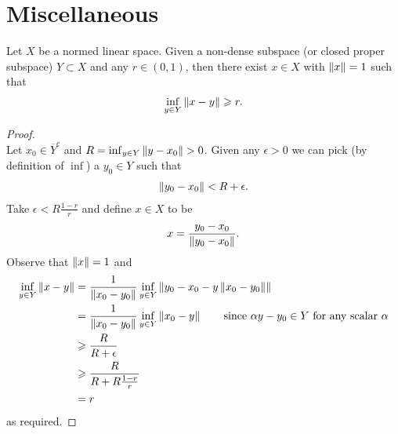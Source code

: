 \documentclass{article}
\begin{document}
\section{Miscellaneous}
\begin{flemma}
Let $X$ be a normed linear space. Given a non-dense subspace (or closed proper subspace) $Y \subset X$ and any $r \in (0, 1)$, then there exist $x \in X$ with $\norm[x] = 1$ such that 
\begin{align*}
\inf_{y \in Y} \norm[x - y] \geq r. 
\end{align*}


\begin{proof}\hfill \\
Let $x_0 \in \overline{Y}^c$ and $R = \inf_{y \in Y}\norm[y - x_0] > 0$. Given any $\epsilon > 0$ we can pick (by definition of $\inf$) a $y_0 \in Y$ such that 
\begin{align*}
\norm[y_0 - x_0] < R + \epsilon. 
\end{align*}
Take $\epsilon < R \frac{1 - r}{r}$ and define $x \in X$ to be
\begin{align*}
x = \frac{y_0 - x_0}{\norm[y_0 - x_0]}. 
\end{align*}
Observe that $\norm[x] = 1$ and 
\begin{align*}
\inf_{y \in Y} \norm[x - y] 
&= \frac{1}{\norm[x_0 - y_0]} \inf_{y \in Y} \norm[y_0 - x_0 - y \norm[x_0 - y_0] ] \\
&= \frac{1}{\norm[x_0 - y_0]} \inf_{y \in Y} \norm[x_0 - y] \tag*{since $\alpha y - y_0 \in Y$ for any scalar $\alpha$} \\
&\geq \frac{R}{R + \epsilon} \\
&\geq \frac{R}{R + R \frac{1 - r}{r}} \\
&= r
\end{align*}
as required. 
\end{proof}
\end{flemma}
\end{document}
